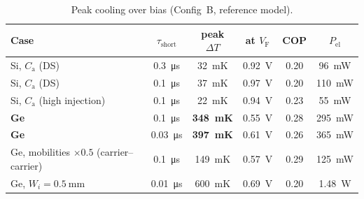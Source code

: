 \documentclass[11pt,a4paper]{article}
\newcommand{\VF}{V_{\mathrm{F}}}
\newcommand{\Ca}{C_{\mathrm{a}}}
\begin{document}
\begin{table}[h]
\centering\small
\caption{Peak cooling over bias (Config~B, reference model).}
\label{tab:ref}
\begin{tabular}{lccccc}
\toprule
Case & $\tau_{\mathrm{short}}$ & peak $\Delta T$ & at $\VF$ & COP & $P_{\mathrm{el}}$\\
\midrule
Si, $\Ca$ (DS) & \SI{0.3}{\micro\second} & \SI{32}{\milli\kelvin} & \SI{0.92}{\volt} & 0.20 & \SI{96}{\milli\watt}\\
Si, $\Ca$ (DS) & \SI{0.1}{\micro\second} & \SI{37}{\milli\kelvin} & \SI{0.97}{\volt} & 0.20 & \SI{110}{\milli\watt}\\
Si, $\Ca$ (high injection) & \SI{0.1}{\micro\second} & \SI{22}{\milli\kelvin} & \SI{0.94}{\volt} & 0.23 & \SI{55}{\milli\watt}\\
\textbf{Ge} & \SI{0.1}{\micro\second} & \textbf{\SI{348}{\milli\kelvin}} & \SI{0.55}{\volt} & 0.28 & \SI{295}{\milli\watt}\\
\textbf{Ge} & \SI{0.03}{\micro\second} & \textbf{\SI{397}{\milli\kelvin}} & \SI{0.61}{\volt} & 0.26 & \SI{365}{\milli\watt}\\
Ge, mobilities $\times0.5$ (carrier--carrier) & \SI{0.1}{\micro\second} & \SI{149}{\milli\kelvin} & \SI{0.57}{\volt} & 0.29 & \SI{125}{\milli\watt}\\
Ge, $W_i=\SI{0.5}{\milli\metre}$ & \SI{0.01}{\micro\second} & \SI{600}{\milli\kelvin} & \SI{0.69}{\volt} & 0.20 & \SI{1.48}{\watt}\\
\bottomrule
\end{tabular}
\end{table}
\end{document}
